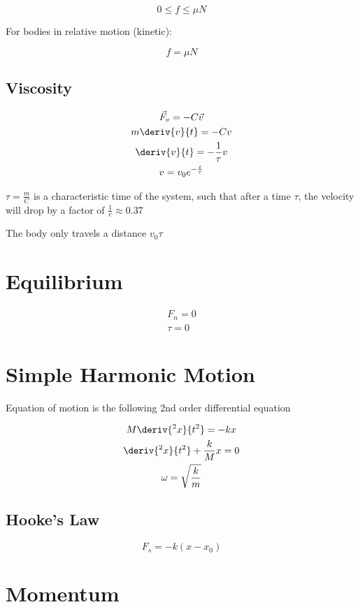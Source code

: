 \documentclass{notes}
\begin{document}
\[0 \leq f \leq \mu N\]

For bodies in relative motion (kinetic):

\[f = \mu N\]

\subsection{Viscosity}

\begin{gather}
    \vec{F}_v = -C\vec{v}\\
    m\deriv{v}{t} = -Cv\\
    \deriv{v}{t} = -\frac{1}{\tau}v\\
    v = v_0e^{-\frac{t}{\tau}}
\end{gather}

\(\tau=\frac{m}{C}\) is a characteristic time of the system, such that after a time \(\tau\), the velocity will drop by a factor of \(\frac{1}{e} \approx 0.37\)

The body only travels a distance \(v_0\tau\)

\section{Equilibrium}

\begin{gather}
    F_n = 0\\
    \tau = 0
\end{gather}

\section{Simple Harmonic Motion}

Equation of motion is the following 2nd order differential equation

\begin{gather}
    M\deriv{^2x}{t^2} = -kx\\
    \deriv{^2x}{t^2} + \frac{k}{M}x = 0 \\
    \omega = \sqrt{\frac{k}{m}}
\end{gather}

\subsection{Hooke's Law}

\[F_s = -k(x-x_0)\]

\section{Momentum}
\end{document}
